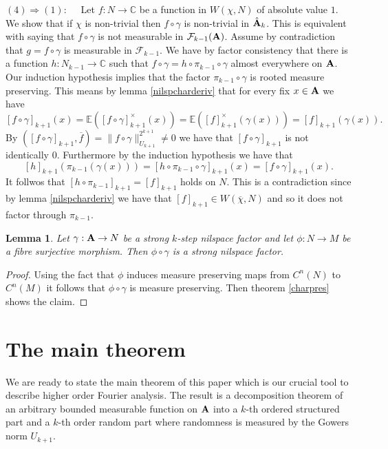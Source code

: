 \documentclass [11pt] {article}
\newtheorem{lemma}{Lemma}[section]
\def\bA{{\bf A}}
\begin{document}
\bigskip

\noindent$(4)\Rightarrow(1):$~~ Let $f:N\rightarrow\mathbb{C}$ be a function in $W(\chi,N)$ of absolute value $1$.  
We show that if $\chi$ is non-trivial then $f\circ\gamma$ is non-trivial in $\hat{\bA}_k$. This is equivalent with saying that $f\circ\gamma$ is not measurable in $\mathcal{F}_{k-1}(\bA)$.
Assume by contradiction that $g=f\circ\gamma$ is measurable in $\mathcal{F}_{k-1}$. We have by factor consistency that there is a function $h:N_{k-1}\rightarrow\mathbb{C}$ such that $f\circ\gamma=h\circ\pi_{k-1}\circ\gamma$ almost everywhere on $\bA$. Our induction hypothesis implies that the factor $\pi_{k-1}\circ\gamma$ is rooted measure preserving. This means by lemma \ref{nilspcharderiv} that for every fix $x\in\bA$ we have $$[f\circ\gamma]_{k+1}(x)=\mathbb{E}([f\circ\gamma]_{k+1}^\times(x))=\mathbb{E}([f]_{k+1}^\times(\gamma(x)))=[f]_{k+1}(\gamma(x)).$$
By $([f\circ\gamma]_{k+1},\overline{f})=\|f\circ\gamma\|^{2^{k+1}}_{U_{k+1}}\neq 0$ we have that $[f\circ\gamma]_{k+1}$ is not identically $0$.  
Furthermore by the induction hypothesis we have that
$$[h]_{k+1}(\pi_{k-1}(\gamma(x)))=[h\circ\pi_{k-1}\circ\gamma]_{k+1}(x)=[f\circ\gamma]_{k+1}(x).$$
It follwos that $[h\circ\pi_{k-1}]_{k+1}=[f]_{k+1}$ holds on $N$. This is a contradiction since by lemma \ref{nilspcharderiv} we have that $[f]_{k+1}\in W(\overline{\chi},N)$ and so it does not factor through $\pi_{k-1}$.

\medskip

\begin{lemma}\label{strongcirc} Let $\gamma:\bA\rightarrow N$ be a strong $k$-step nilspace factor and let $\phi:N\rightarrow M$ be a fibre surjective morphism. Then $\phi\circ\gamma$ is a strong nilspace factor.
\end{lemma}

\begin{proof} Using the fact that $\phi$ induces measure preserving maps from $C^n(N)$ to $C^n(M)$ it follows that $\phi\circ\gamma$ is measure preserving. Then theorem \ref{charpres} shows the claim.
\end{proof}

\section{The main theorem}

We are ready to state the main theorem of this paper which is our crucial tool to describe higher order Fourier analysis.
The result is a decomposition theorem of an arbitrary bounded measurable function on $\bA$ into a $k$-th ordered structured part and a $k$-th order random part where randomness is measured by the Gowers norm $U_{k+1}$.
\end{document}
